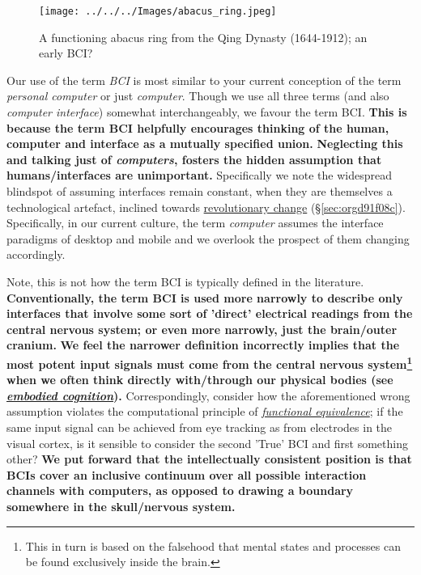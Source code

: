 \documentclass[logo,bsc,singlespacing,parskip]{infthesis}
\begin{document}
\begin{wrapfigure}{r}{0.55\textwidth}
\centering
\texttt{[image: ../../../Images/abacus\_ring.jpeg]}
\caption[Abacus ring; an early BCI]{A functioning abacus ring from the Qing Dynasty (1644-1912); an early BCI?}
\end{wrapfigure}

Our use of the term \emph{BCI} is most similar to your current conception of the term \emph{personal computer} or just \emph{computer}.
Though we use all three terms (and also \emph{computer interface}) somewhat interchangeably, we favour the term BCI.
\textbf{This is because the term BCI helpfully encourages thinking of the human, computer and interface as a mutually specified union.}
\textbf{Neglecting this and talking just of \emph{computers}, fosters the hidden assumption that humans/interfaces are unimportant.}
Specifically we note the widespread blindspot of assuming interfaces remain constant, when they are themselves a technological artefact, inclined towards \hyperref[sec:orgd91f08c]{revolutionary change} (\S \ref{sec:orgd91f08c}).
Specifically, in our current culture, the term \emph{computer} assumes the interface paradigms of desktop and mobile and we overlook the prospect of them changing accordingly.

Note, this is not how the term BCI is typically defined in the literature.
\textbf{Conventionally, the term BCI is used more narrowly to describe only interfaces that involve some sort of 'direct' electrical readings from the central nervous system; or even more narrowly, just the brain/outer cranium.}
\textbf{We feel the narrower definition incorrectly implies that the most potent input signals must come from the central nervous system\footnote{This in turn is based on the falsehood that mental states and processes can be found exclusively inside the brain.} when we often think directly with/through our physical bodies (see \emph{\hyperref[orgcc8d0dd]{embodied cognition}}).}
Correspondingly, consider how the aforementioned wrong assumption violates the computational principle of \emph{\hyperref[org2986c1c]{functional equivalence}}; if the same input signal can be achieved from eye tracking as from electrodes in the visual cortex, is it sensible to consider the second 'True' BCI and first something other?
\textbf{We put forward that the intellectually consistent position is that BCIs cover an inclusive continuum over all possible interaction channels with computers, as opposed to drawing a boundary somewhere in the skull/nervous system.}
\end{document}

